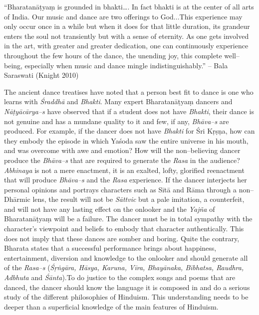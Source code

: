 \begin{myquote}
“Bharatanāṭyaṃ is grounded in bhakti…. In fact bhakti is at the center of all arts of India. Our music and dance are two offerings to God...This experience may only occur once in a while but when it does for that little duration, its grandeur enters the soul not transiently but with a sense of eternity. As one gets involved in the art, with greater and greater dedication, one can continuously experience throughout the few hours of the dance, the unending joy, this complete well–being, especially when music and dance mingle indistinguishably.” – Bala Saraswati (Knight 2010)
\end{myquote}

The ancient dance treatises have noted that a person best fit to dance is one who learns with \textit{Śraddhā} and \textit{Bhakti}. Many expert Bharatanāṭyaṃ dancers and \textit{Nāṭyācārya–s }have observed that if a student does not have \textit{Bhakti}, their dance is not genuine and has a mundane quality to it and few, if any, \textit{Bhāva–s} are produced. For example, if the dancer does not have \textit{Bhakti} for Śri Kṛṣṇa, how can they embody the episode in which Yaśoda saw the entire universe in his mouth, and was overcome with awe and emotion? How will the non–believing dancer produce the \textit{Bhāva–s} that are required to generate the \textit{Rasa} in the audience? \textit{Abhinaya} is not a mere enactment, it is an exalted, lofty, glorified reenactment that will produce \textit{Bhāva–s} and the \textit{Rasa} experience. If the dancer interjects her personal opinions and portrays characters such as Sītā and Rāma through a non–Dhārmic lens, the result will not be \textit{Sāttvic} but a pale imitation, a counterfeit, and will not have any lasting effect on the onlooker and the \textit{Yajña} of Bharatanāṭyaṃ will be a failure. The dancer must be in total sympathy with the character’s viewpoint and beliefs to embody that character authentically. This does not imply that these dances are somber and boring. Quite the contrary, Bharata states that a successful performance brings about happiness, entertainment, diversion and knowledge to the onlooker and should generate all of the \textit{Rasa–s} (\textit{Śṛṅgāra, Hāsya, Karuna, Vīra, Bhayānaka, Bībhatsa, Raudhra, Adbhuta} and \textit{Śānta}).To do justice to the complex songs and poems that are danced, the dancer should know the language it is composed in and do a serious study of the different philosophies of Hinduism. This understanding needs to be deeper than a superficial knowledge of the main features of Hinduism.


